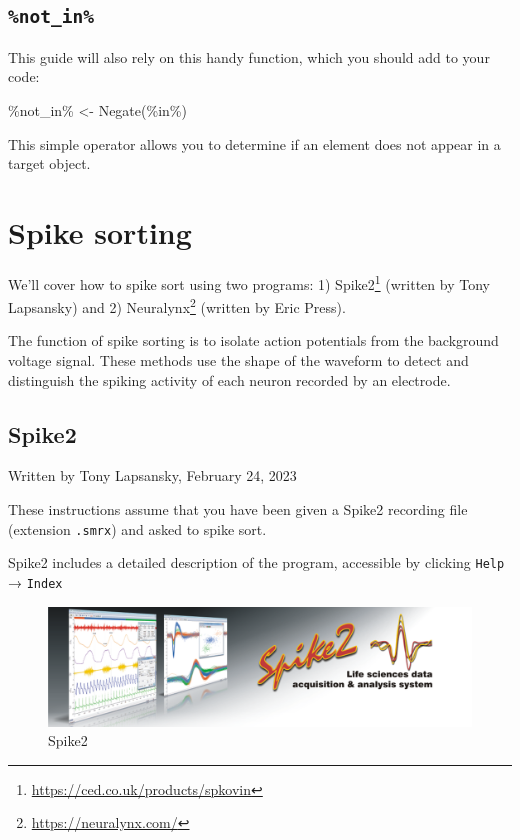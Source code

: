 \documentclass[
]{book}
\newenvironment{Shaded}{\begin{snugshade}}{\end{snugshade}}
\newcommand{\AttributeTok}[1]{\textcolor[rgb]{0.77,0.63,0.00}{#1}}
\newcommand{\FunctionTok}[1]{\textcolor[rgb]{0.00,0.00,0.00}{#1}}
\newcommand{\NormalTok}[1]{#1}
\newcommand{\OtherTok}[1]{\textcolor[rgb]{0.56,0.35,0.01}{#1}}
\newcommand{\StringTok}[1]{\textcolor[rgb]{0.31,0.60,0.02}{#1}}
\DeclareRobustCommand{\href}[2]{#2\footnote{\url{#1}}}
\begin{document}
\hypertarget{not_in}{%
\section{\texorpdfstring{\texttt{\%not\_in\%}}{\%not\_in\%}}\label{not_in}}

This guide will also rely on this handy function, which you should add to your
code:

\begin{Shaded}
\begin{Highlighting}[]
\StringTok{\textasciigrave{}}\AttributeTok{\%not\_in\%}\StringTok{\textasciigrave{}} \OtherTok{\textless{}{-}} \FunctionTok{Negate}\NormalTok{(}\StringTok{\textasciigrave{}}\AttributeTok{\%in\%}\StringTok{\textasciigrave{}}\NormalTok{)}
\end{Highlighting}
\end{Shaded}

This simple operator allows you to determine if an element does not appear in a
target object.

\hypertarget{spike-sorting}{%
\chapter{Spike sorting}\label{spike-sorting}}

We'll cover how to spike sort using two programs: 1) \href{https://ced.co.uk/products/spkovin}{Spike2} (written
by Tony Lapsansky) and 2) \href{https://neuralynx.com/}{Neuralynx} (written by Eric Press).

The function of spike sorting is to isolate action potentials from the background voltage signal. These methods use the shape of the waveform to detect and distinguish the spiking activity of each neuron recorded by an electrode.

\hypertarget{spike2}{%
\section{Spike2}\label{spike2}}

Written by Tony Lapsansky, February 24, 2023

These instructions assume that you have been given a Spike2 recording file (extension \texttt{.smrx}) and asked to spike sort.

Spike2 includes a detailed description of the program, accessible by clicking
\texttt{Help} → \texttt{Index}

\begin{figure}
\centering
\includegraphics{source_images/sec3.1.1_spike2_banner.png}
\caption{Spike2}
\end{figure}
\end{document}
